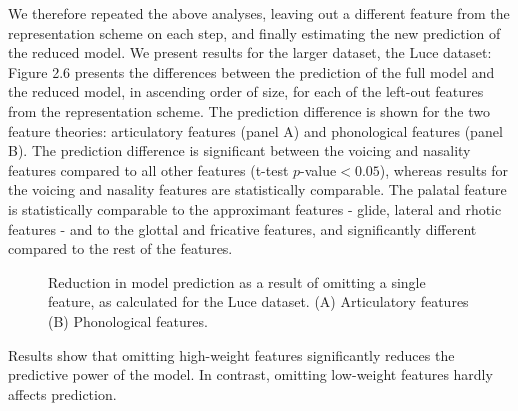 We therefore repeated the above analyses, leaving out a different feature from the representation scheme on each step, and finally estimating the new prediction of the reduced model. We present results for the larger dataset, the Luce dataset: Figure 2.6 presents the differences between the prediction of the full model and the reduced model, in ascending order of size, for each of the left-out features from the representation scheme. The prediction difference is shown for the two feature theories: articulatory features (panel A) and phonological features (panel B). The prediction difference is significant between the voicing and nasality features compared to all other features (t-test $p$-value$<0.05$), whereas results for the voicing and nasality features are statistically comparable. The palatal feature is statistically comparable to the approximant features - glide, lateral and rhotic features - and to the glottal and fricative features, and significantly different compared to the rest of the features.

\begin{figure}
\vspace{.3in}
\caption{Reduction in model prediction as a result of omitting a single feature, as calculated for the Luce dataset. (A) Articulatory features (B) Phonological features.}
\end{figure}

Results show that omitting high-weight features significantly reduces the predictive power of the model. In contrast, omitting low-weight features hardly affects prediction.

